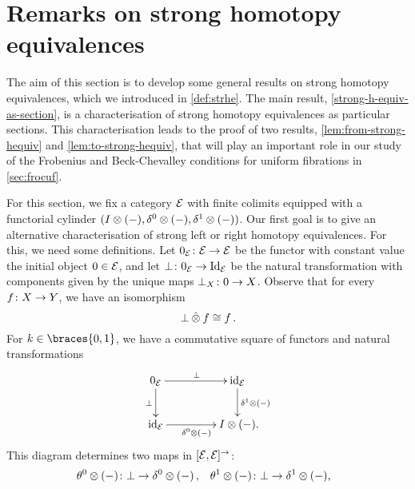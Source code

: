 \documentclass[reqno,10pt,a4paper,oneside,draft]{amsart}
\begin{document}
\section{Remarks on strong homotopy equivalences}
\label{sec:remshe}

The aim of this section is to develop some general results on strong homotopy equivalences, which we introduced in \cref{def:strhe}.
The main result, \cref{strong-h-equiv-as-section}, is a characterisation of strong homotopy equivalences as particular sections.
This characterisation leads to the proof of two results, \cref{lem:from-strong-hequiv} and \cref{lem:to-strong-hequiv}, that will play an important role in our study of the Frobenius and Beck-Chevalley conditions for uniform fibrations in \cref{sec:frocuf}.

For this section, we fix a category $\mathcal{E}$ with finite colimits equipped with a functorial cylinder $(I \otimes (-), \delta^0 \otimes (-), \delta^1 \otimes (-))$.
Our first goal is to give an alternative characterisation of strong left or right homotopy equivalences.
For this, we need some definitions.
Let $0_{\mathcal{E}} \colon \mathcal{E} \to \mathcal{E}$ be the functor with constant value the initial object $0 \in \mathcal{E}$, and let $\bot \colon 0_{\mathcal{E}} \rightarrow \operatorname{Id}_{\mathcal{E}}$ be the natural transformation with components given by the unique maps $\bot_X \colon 0 \to X$.
Observe that for every $f \colon X \to Y$, we have an isomorphism
\begin{equation}
\label{equ:bot-hatotimes-f}
\bot \mathbin{\hat{\otimes}} f \cong f \, .
\end{equation}
For $k \in \braces{0, 1}$, we have a commutative square of functors and natural transformations
\begin{equation} \label{the-trivial-square}
\begin{gathered}
\xymatrix@C+2em{
  0_\catE
  \ar[r]^{\bot}
  \ar[d]_{\bot}
&
  \id_\catE
  \ar[d]^{\rcyl \otimes (-)}
\\
  \id_\catE
  \ar[r]_{\lcyl \otimes (-)}
&
  \interval \otimes (-)
\rlap{.}}
\end{gathered}
\end{equation}
This diagram determines two maps in $[\mathcal{E}, \mathcal{E}]^\to$:
\begin{equation} \label{equ:thetas}
\begin{aligned}
  \thetal \otimes (-) &\co \bot \rightarrow \lcyl \otimes (-)
\, ,&
  \thetar \otimes (-) &\co \bot \rightarrow \rcyl \otimes (-) \rlap{,}
\end{aligned}
\end{equation}
\end{document}

